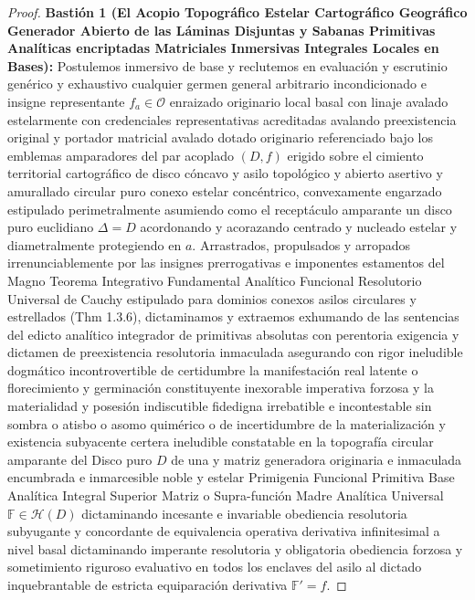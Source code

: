 \documentclass[11pt,a4paper]{article}
\theoremstyle{definition}
\theoremstyle{remark}
\numberwithin{equation}{section}
\begin{document}
\begin{proof}
\textbf{Bastión 1 (El Acopio Topográfico Estelar Cartográfico Geográfico Generador Abierto de las Láminas Disjuntas y Sabanas Primitivas Analíticas encriptadas Matriciales Inmersivas Integrales Locales en Bases):} 
Postulemos inmersivo de base y reclutemos en evaluación y escrutinio genérico y exhaustivo cualquier germen general arbitrario incondicionado e insigne representante $f_a \in \mathcal{O}$ enraizado originario local basal con linaje avalado estelarmente con credenciales representativas acreditadas avalando preexistencia original y portador matricial avalado dotado originario referenciado bajo los emblemas amparadores del par acoplado $(D, f)$ erigido sobre el cimiento territorial cartográfico de disco cóncavo y asilo topológico y abierto asertivo y amurallado circular puro conexo estelar concéntrico, convexamente engarzado estipulado perimetralmente asumiendo como el receptáculo amparante un disco puro euclidiano $\Delta = D$ acordonando y acorazando centrado y nucleado estelar y diametralmente protegiendo en $a$. Arrastrados, propulsados y arropados irrenunciablemente por las insignes prerrogativas e imponentes estamentos del Magno Teorema Integrativo Fundamental Analítico Funcional Resolutorio Universal de Cauchy estipulado para dominios conexos asilos circulares y estrellados (Thm 1.3.6), dictaminamos y extraemos exhumando de las sentencias del edicto analítico integrador de primitivas absolutas con perentoria exigencia y dictamen de preexistencia resolutoria inmaculada asegurando con rigor ineludible dogmático incontrovertible de certidumbre la manifestación real latente o florecimiento y germinación constituyente inexorable imperativa forzosa y la materialidad y posesión indiscutible fidedigna irrebatible e incontestable sin sombra o atisbo o asomo quimérico o de incertidumbre de la materialización y existencia subyacente certera ineludible constatable en la topografía circular amparante del Disco puro $D$ de una y matriz generadora originaria e inmaculada encumbrada e inmarcesible noble y estelar Primigenia Funcional Primitiva Base Analítica Integral Superior Matriz o Supra-función Madre Analítica Universal $\mathbb{F} \in \mathcal{H}(D)$ dictaminando incesante e invariable obediencia resolutoria subyugante y concordante de equivalencia operativa derivativa infinitesimal a nivel basal dictaminando imperante resolutoria y obligatoria obediencia forzosa y sometimiento riguroso evaluativo en todos los enclaves del asilo al dictado inquebrantable de estricta equiparación derivativa $\mathbb{F}' = f$.

\end{proof}
\end{document}
